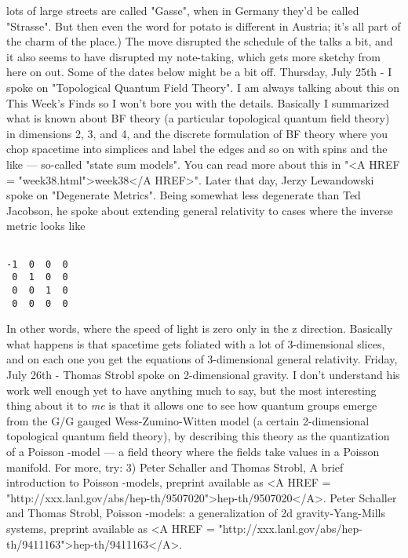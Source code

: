lots of large streets are called "Gasse", when in Germany they'd
be called "Strasse".  But then even the word for potato is
different in Austria; it's all part of the charm of the place.)  
The move disrupted the schedule of the talks a bit, and it also
seems to have disrupted my note-taking, which gets more sketchy
from here on out.  Some of the dates below might be a bit off.
Thursday, July 25th - I spoke on "Topological Quantum Field
Theory".  I am always talking about this on This Week's Finds so
I won't bore you with the details.  Basically I summarized what
is known about BF theory (a particular topological quantum field
theory) in dimensions 2, 3, and 4, and the discrete formulation
of BF theory where you chop spacetime into simplices and label
the edges and so on with spins and the like --- so-called "state
sum models".  You can read more about this in 
"<A HREF = "week38.html">week38</A HREF>".
Later that day, Jerzy Lewandowski spoke on "Degenerate Metrics".
Being somewhat less degenerate than Ted Jacobson, he spoke about
extending general relativity to cases where the inverse metric
looks like

\begin{verbatim}

-1  0  0  0
 0  1  0  0
 0  0  1  0 
 0  0  0  0
\end{verbatim}
    
In other words, where the speed of light is zero only in the z
direction.  Basically what happens is that spacetime gets
foliated with a lot of 3-dimensional slices, and on each one you
get the equations of 3-dimensional general relativity.
Friday, July 26th - Thomas Strobl spoke on 2-dimensional
gravity. I don't understand his work well enough yet to have
anything much to say, but the most interesting thing about it to
\emph{me} is that it allows one to see how quantum groups emerge from
the G/G gauged Wess-Zumino-Witten model (a certain 2-dimensional
topological quantum field theory), by describing this theory as
the quantization of a Poisson \sigma -model --- a field theory
where the fields take values in a Poisson manifold.  For more,
try:
3) Peter Schaller and Thomas Strobl, A brief introduction to
Poisson \sigma -models, preprint available as 
<A HREF = "http://xxx.lanl.gov/abs/hep-th/9507020">hep-th/9507020</A>.
Peter Schaller and Thomas Strobl, Poisson \sigma -models: a
generalization of 2d gravity-Yang-Mills systems, preprint
available as <A HREF =
"http://xxx.lanl.gov/abs/hep-th/9411163">hep-th/9411163</A>.

